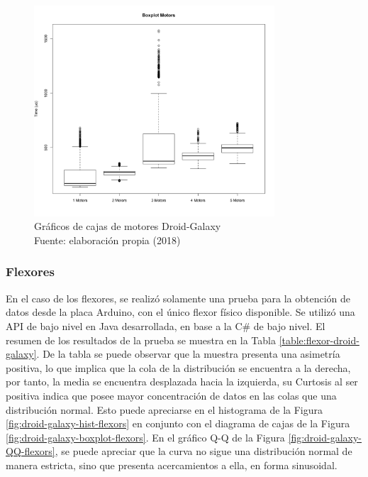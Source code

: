\begin{figure}[H]
  \begin{center} 
   	\includegraphics[width=0.8\textwidth]{evaluation/graphics/Droid/Galaxy/BoxplotMotorsDroidGalaxy.png} 
    \caption[Gráficos de cajas de motores Droid-Galaxy]{Gráficos de cajas de motores Droid-Galaxy\\Fuente: elaboración propia (2018)} 
    \label{fig:droid-galaxy-boxplot-motors}
  \end{center}
\end{figure}



\subsubsection{Flexores}
En el caso de los flexores, se realizó solamente una prueba para la obtención de datos desde la placa Arduino, con el único flexor físico disponible. Se utilizó una API de bajo nivel en Java desarrollada, en base a la C\# de bajo nivel. El resumen de los resultados de la prueba se muestra en la Tabla \ref{table:flexor-droid-galaxy}. De la tabla se puede observar que la muestra presenta una asimetría positiva, lo que implica que la cola de la distribución se encuentra a la derecha, por tanto, la media se encuentra desplazada hacia la izquierda, su Curtosis al ser positiva indica que posee mayor concentración de datos en las colas que una distribución normal. Esto puede apreciarse en el histograma de la Figura \ref{fig:droid-galaxy-hist-flexors} en conjunto con el diagrama de cajas de la Figura \ref{fig:droid-galaxy-boxplot-flexors}. En el gráfico Q-Q de la Figura \ref{fig:droid-galaxy-QQ-flexors}, se puede apreciar que la curva no sigue una distribución normal de manera estricta, sino que presenta acercamientos a ella, en forma sinusoidal.

